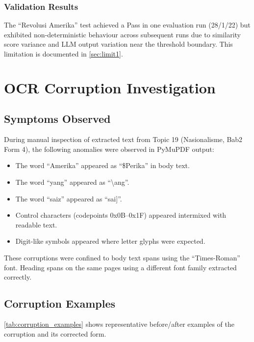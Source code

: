 \documentclass[12pt, a4paper]{report}
\begin{document}
\subsection{Validation Results}

The ``Revolusi Amerika'' test achieved a Pass in one evaluation run (28/1/22)
but exhibited non-deterministic behaviour across subsequent runs due to
similarity score variance and LLM output variation near the threshold boundary.
This limitation is documented in \cref{sec:limit1}.


\chapter{OCR Corruption Investigation}
\label{ch:ocr}

\section{Symptoms Observed}

During manual inspection of extracted text from Topic 19 (Nasionalisme, Bab2
Form 4), the following anomalies were observed in PyMuPDF output:

\begin{itemize}[noitemsep]
  \item The word ``Amerika'' appeared as ``\$Perika'' in body text.
  \item The word ``yang'' appeared as ``\textbackslash ang''.
  \item The word ``saiz'' appeared as ``sai]''.
  \item Control characters (codepoints 0x0B--0x1F) appeared intermixed with
        readable text.
  \item Digit-like symbols appeared where letter glyphs were expected.
\end{itemize}

These corruptions were confined to body text spans using the ``Times-Roman''
font. Heading spans on the same pages using a different font family extracted
correctly.

\section{Corruption Examples}

\cref{tab:corruption_examples} shows representative before/after examples of
the corruption and its corrected form.
\end{document}
